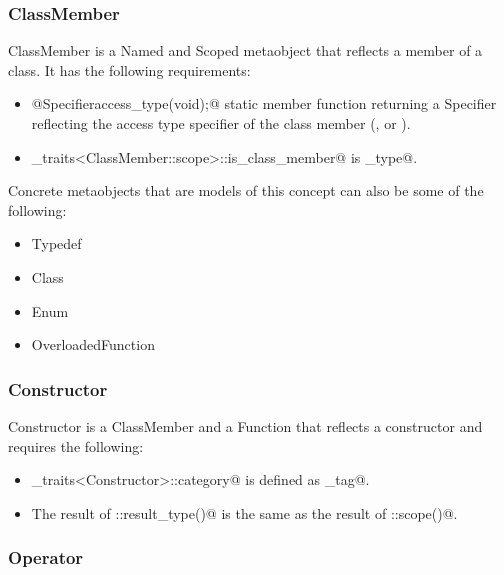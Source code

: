 \subsubsection{ClassMember}

{\metaobject ClassMember} is a {\metaobject Named} and {\metaobject Scoped} metaobject
that reflects a member of a class. It has the following requirements:

\begin{itemize}
	\item{\verb@static @{\metaobject Specifier}\verb@ access_type(void);@} static member function returning
	a {\metaobject Specifier} reflecting the access type specifier of the class member
	(\verb@private@, \verb@protected@ or \verb@public@).

	\item \verb@metaobject_traits<ClassMember::scope>::is_class_member@ is \verb@true_type@.
\end{itemize}

Concrete metaobjects that are models of this concept can also be some of the following:
\begin{itemize}
	\item{\metaobject Typedef}
	\item{\metaobject Class}
	\item{\metaobject Enum}
	\item{\metaobject OverloadedFunction}
\end{itemize}

\subsubsection{Constructor}

{\metaobject Constructor} is a {\metaobject ClassMember} and a {\metaobject Function} that
reflects a constructor and requires the following:

\begin{itemize}
	\item \verb@metaobject_traits<Constructor>::category@ is defined as  \verb@constructor_tag@.

	\item The result of \verb@Constructor::result_type()@ is the same as the result of
	\verb@Constructor::scope()@.
\end{itemize}

\subsubsection{Operator}

